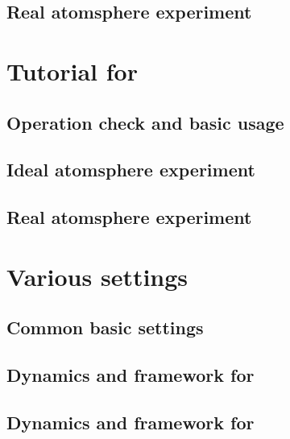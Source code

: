 \documentclass[a4paper]{report}
\begin{document}
 \chapter{Real atomsphere experiment} \label{chap:tutorial_real}


\part{Tutorial for \scalegm}
 \chapter{Operation check and basic usage}
 \chapter{Ideal atomsphere experiment}
 \chapter{Real atomsphere experiment}


\part{Various settings} \label{chap:basic_usel}
 \chapter{Common basic settings}

 \chapter{Dynamics and framework for \scalerm}

 \chapter{Dynamics and framework for \scalegm}
\end{document}
